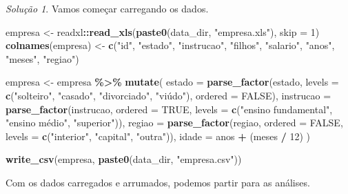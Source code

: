 \documentclass[
]{latex/krantz}
\newenvironment{Shaded}{\begin{snugshade}}{\end{snugshade}}
\newcommand{\AttributeTok}[1]{\textcolor[rgb]{0.13,0.29,0.53}{#1}}
\newcommand{\ConstantTok}[1]{\textcolor[rgb]{0.56,0.35,0.01}{#1}}
\newcommand{\DecValTok}[1]{\textcolor[rgb]{0.00,0.00,0.81}{#1}}
\newcommand{\FunctionTok}[1]{\textcolor[rgb]{0.13,0.29,0.53}{\textbf{#1}}}
\newcommand{\NormalTok}[1]{#1}
\newcommand{\OtherTok}[1]{\textcolor[rgb]{0.56,0.35,0.01}{#1}}
\newcommand{\SpecialCharTok}[1]{\textcolor[rgb]{0.81,0.36,0.00}{\textbf{#1}}}
\newcommand{\StringTok}[1]{\textcolor[rgb]{0.31,0.60,0.02}{#1}}
\theoremstyle{definition}
\theoremstyle{definition}
\theoremstyle{definition}
\theoremstyle{definition}
\theoremstyle{remark}
\newtheorem*{solution}{Solução}
\begin{document}
\begin{solution}
Vamos começar carregando os dados.

\begin{Shaded}
\begin{Highlighting}[]
\NormalTok{empresa }\OtherTok{\textless{}{-}}\NormalTok{ readxl}\SpecialCharTok{::}\FunctionTok{read\_xls}\NormalTok{(}\FunctionTok{paste0}\NormalTok{(data\_dir, }\StringTok{"empresa.xls"}\NormalTok{), }\AttributeTok{skip =} \DecValTok{1}\NormalTok{)}
\FunctionTok{colnames}\NormalTok{(empresa) }\OtherTok{\textless{}{-}} \FunctionTok{c}\NormalTok{(}\StringTok{"id"}\NormalTok{, }\StringTok{"estado"}\NormalTok{, }\StringTok{"instrucao"}\NormalTok{, }\StringTok{"filhos"}\NormalTok{, }\StringTok{"salario"}\NormalTok{, }\StringTok{"anos"}\NormalTok{, }\StringTok{"meses"}\NormalTok{, }\StringTok{"regiao"}\NormalTok{)}

\NormalTok{empresa }\OtherTok{\textless{}{-}}\NormalTok{ empresa }\SpecialCharTok{\%\textgreater{}\%}
              \FunctionTok{mutate}\NormalTok{(}
                \AttributeTok{estado =} \FunctionTok{parse\_factor}\NormalTok{(estado, }\AttributeTok{levels =} \FunctionTok{c}\NormalTok{(}\StringTok{"solteiro"}\NormalTok{, }\StringTok{"casado"}\NormalTok{, }\StringTok{"divorciado"}\NormalTok{, }\StringTok{"viúdo"}\NormalTok{), }\AttributeTok{ordered =} \ConstantTok{FALSE}\NormalTok{),}
                \AttributeTok{instrucao =} \FunctionTok{parse\_factor}\NormalTok{(instrucao, }\AttributeTok{ordered =} \ConstantTok{TRUE}\NormalTok{, }\AttributeTok{levels =} \FunctionTok{c}\NormalTok{(}\StringTok{"ensino fundamental"}\NormalTok{, }\StringTok{"ensino médio"}\NormalTok{, }\StringTok{"superior"}\NormalTok{)),}
                \AttributeTok{regiao =} \FunctionTok{parse\_factor}\NormalTok{(regiao, }\AttributeTok{ordered =} \ConstantTok{FALSE}\NormalTok{, }\AttributeTok{levels =} \FunctionTok{c}\NormalTok{(}\StringTok{"interior"}\NormalTok{, }\StringTok{"capital"}\NormalTok{, }\StringTok{"outra"}\NormalTok{)),}
                \AttributeTok{idade =}\NormalTok{ anos }\SpecialCharTok{+}\NormalTok{ (meses }\SpecialCharTok{/} \DecValTok{12}\NormalTok{)}
\NormalTok{              )}

\FunctionTok{write\_csv}\NormalTok{(empresa, }\FunctionTok{paste0}\NormalTok{(data\_dir, }\StringTok{"empresa.csv"}\NormalTok{))}
\end{Highlighting}
\end{Shaded}

Com os dados carregados e arrumados, podemos partir para as análises.


\end{solution}
\end{document}
